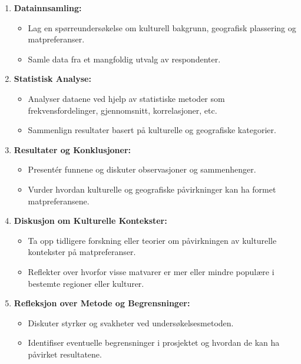 \documentclass{article}
\begin{document}
\begin{enumerate}[label=\arabic*.]
  \item \textbf{Datainnsamling:}
  \begin{itemize}
    \item Lag en spørreundersøkelse om kulturell bakgrunn, geografisk plassering og matpreferanser.
    \item Samle data fra et mangfoldig utvalg av respondenter.
  \end{itemize}
  
  \item \textbf{Statistisk Analyse:}
  \begin{itemize}
    \item Analyser dataene ved hjelp av statistiske metoder som frekvensfordelinger, gjennomsnitt, korrelasjoner, etc.
    \item Sammenlign resultater basert på kulturelle og geografiske kategorier.
  \end{itemize}
  
  \item \textbf{Resultater og Konklusjoner:}
  \begin{itemize}
    \item Presentér funnene og diskuter observasjoner og sammenhenger.
    \item Vurder hvordan kulturelle og geografiske påvirkninger kan ha formet matpreferansene.
  \end{itemize}
  
  \item \textbf{Diskusjon om Kulturelle Kontekster:}
  \begin{itemize}
    \item Ta opp tidligere forskning eller teorier om påvirkningen av kulturelle kontekster på matpreferanser.
    \item Reflekter over hvorfor visse matvarer er mer eller mindre populære i bestemte regioner eller kulturer.
  \end{itemize}
  
  \item \textbf{Refleksjon over Metode og Begrensninger:}
  \begin{itemize}
    \item Diskuter styrker og svakheter ved undersøkelsesmetoden.
    \item Identifiser eventuelle begrensninger i prosjektet og hvordan de kan ha påvirket resultatene.
  \end{itemize}
\end{enumerate}
\end{document}

